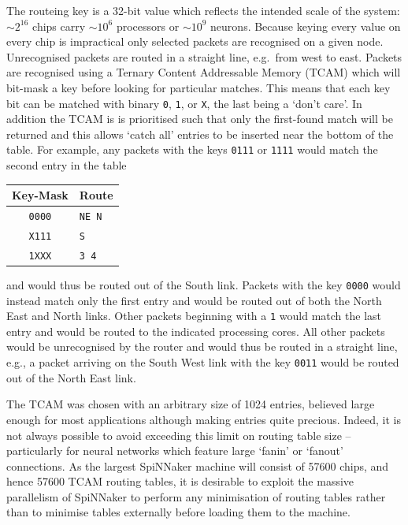 \documentclass[conference]{IEEEtran}
\newcommand{\mytt}[1]{\texttt{\footnotesize#1}}
\begin{document}
The routeing key is a 32-bit value which reflects the intended scale of the system: $\sim2^{16}$ chips carry $\sim10^6$ processors or $\sim10^9$ neurons.
Because keying every value on every chip is impractical only selected packets are recognised on a given node.
Unrecognised packets are routed in a straight line, e.g.\ from west to east.
Packets are recognised using a Ternary Content Addressable Memory (TCAM) which will bit-mask a key before looking for particular matches.
This means that each key bit can be matched with binary \mytt{0}, \mytt{1}, or \mytt{X}, the last being a `don't care'.
In addition the TCAM is is prioritised such that only the first-found match will be returned and this allows `catch all' entries to be inserted near the bottom of the table.
For example, any packets with the keys \mytt{0111} or \mytt{1111} would match the second entry in the table

\begin{table}[H]
  \centering
  \begin{tabular}{c l}
    \toprule
    Key-Mask & Route \\
    \midrule
    \texttt{0000} & \texttt{NE N}\\
    \texttt{X111} & \texttt{S}\\
    \texttt{1XXX} & \texttt{3 4}\\
    \bottomrule
  \end{tabular}
\end{table}

\noindent and would thus be routed out of the South link.
Packets with the key \mytt{0000} would instead match only the first entry and would be routed out of both the North East and North links.
Other packets beginning with a \mytt{1} would match the last entry and would be routed to the indicated processing cores.
All other packets would be unrecognised by the router and would thus be routed in a straight line, e.g., a packet arriving on the South West link with the key \mytt{0011} would be routed out of the North East link.

The TCAM was chosen with an arbitrary size of 1024 entries, believed large enough for most applications although making entries quite precious.
Indeed, it is not always possible to avoid exceeding this limit on routing table size -- particularly for neural networks which feature large `fanin' or `fanout' connections.
As the largest SpiNNaker machine will consist of \num{57600} chips, and hence \num{57600} TCAM routing tables, it is desirable to exploit the massive parallelism of SpiNNaker to perform any minimisation of routing tables rather than to minimise tables externally before loading them to the machine.
\end{document}
